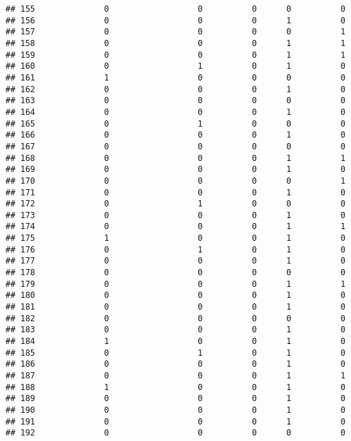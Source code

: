 \documentclass[
]{article}
\begin{document}
\begin{verbatim}
## 155              0                  0          0      0          0
## 156              0                  0          0      1          0
## 157              0                  0          0      0          1
## 158              0                  0          0      1          1
## 159              0                  0          0      1          1
## 160              0                  1          0      1          0
## 161              1                  0          0      0          0
## 162              0                  0          0      1          0
## 163              0                  0          0      0          0
## 164              0                  0          0      1          0
## 165              0                  1          0      0          0
## 166              0                  0          0      1          0
## 167              0                  0          0      0          0
## 168              0                  0          0      1          1
## 169              0                  0          0      1          0
## 170              0                  0          0      0          1
## 171              0                  0          0      1          0
## 172              0                  1          0      0          0
## 173              0                  0          0      1          0
## 174              0                  0          0      1          1
## 175              1                  0          0      1          0
## 176              0                  1          0      1          0
## 177              0                  0          0      1          0
## 178              0                  0          0      0          0
## 179              0                  0          0      1          1
## 180              0                  0          0      1          0
## 181              0                  0          0      1          0
## 182              0                  0          0      0          0
## 183              0                  0          0      1          0
## 184              1                  0          0      1          0
## 185              0                  1          0      1          0
## 186              0                  0          0      1          0
## 187              0                  0          0      1          1
## 188              1                  0          0      1          0
## 189              0                  0          0      1          0
## 190              0                  0          0      1          0
## 191              0                  0          0      1          0
## 192              0                  0          0      0          0

\end{verbatim}
\end{document}
